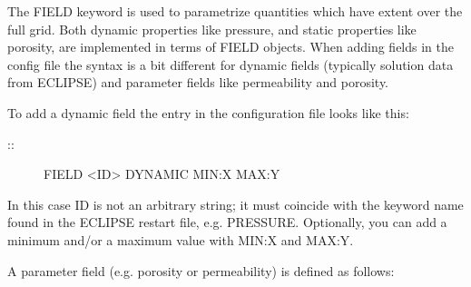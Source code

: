 \documentclass[letterpaper,10pt,english]{sphinxmanual}
\begin{document}
\label{\detokenize{keywords/index:field}}
\begin{sphinxShadowBox}

The FIELD keyword is used to parametrize quantities which have extent over the
full grid. Both dynamic properties like pressure, and static properties like
porosity, are implemented in terms of FIELD objects. When adding fields in the
config file the syntax is a bit different for dynamic fields (typically
solution data from ECLIPSE) and parameter fields like permeability and
porosity.


To add a dynamic field the entry in the configuration file looks like this:
\begin{description}
\item[{::}] \leavevmode
FIELD   \textless{}ID\textgreater{}   DYNAMIC  MIN:X  MAX:Y

\end{description}

In this case ID is not an arbitrary string; it must coincide with the keyword
name found in the ECLIPSE restart file, e.g. PRESSURE. Optionally, you can add
a minimum and/or a maximum value with MIN:X and MAX:Y.


%
\begin{sphinxVerbatim}[commandchars=\\\{\}]
    
  
\end{sphinxVerbatim}


%
\begin{sphinxVerbatim}[commandchars=\\\{\}]
      
    
\end{sphinxVerbatim}


A parameter field (e.g. porosity or permeability) is defined as follows:


\end{sphinxShadowBox}
\end{document}
